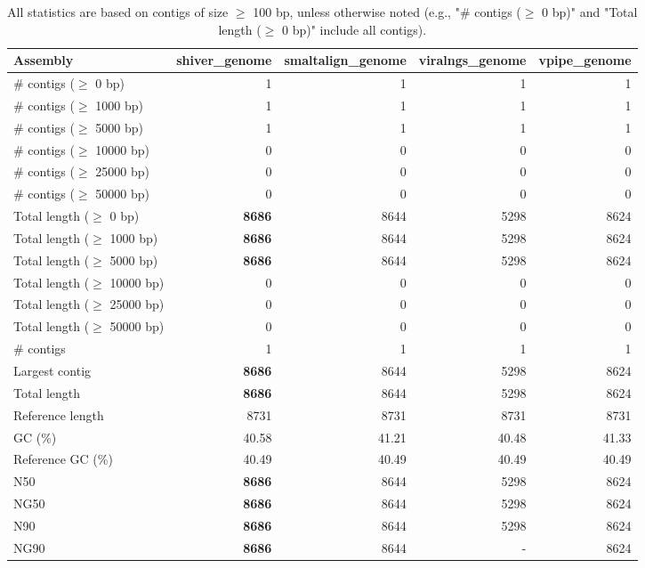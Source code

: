 \documentclass[12pt,a4paper]{article}
\begin{document}
\begin{table}[ht]
\begin{center}
\caption{All statistics are based on contigs of size $\geq$ 100 bp, unless otherwise noted (e.g., "\# contigs ($\geq$ 0 bp)" and "Total length ($\geq$ 0 bp)" include all contigs).}
\begin{tabular}{|l*{4}{|r}|}
\hline
Assembly & shiver\_genome & smaltalign\_genome & viralngs\_genome & vpipe\_genome \\ \hline
\# contigs ($\geq$ 0 bp) & 1 & 1 & 1 & 1 \\ \hline
\# contigs ($\geq$ 1000 bp) & 1 & 1 & 1 & 1 \\ \hline
\# contigs ($\geq$ 5000 bp) & 1 & 1 & 1 & 1 \\ \hline
\# contigs ($\geq$ 10000 bp) & 0 & 0 & 0 & 0 \\ \hline
\# contigs ($\geq$ 25000 bp) & 0 & 0 & 0 & 0 \\ \hline
\# contigs ($\geq$ 50000 bp) & 0 & 0 & 0 & 0 \\ \hline
Total length ($\geq$ 0 bp) & {\bf 8686} & 8644 & 5298 & 8624 \\ \hline
Total length ($\geq$ 1000 bp) & {\bf 8686} & 8644 & 5298 & 8624 \\ \hline
Total length ($\geq$ 5000 bp) & {\bf 8686} & 8644 & 5298 & 8624 \\ \hline
Total length ($\geq$ 10000 bp) & 0 & 0 & 0 & 0 \\ \hline
Total length ($\geq$ 25000 bp) & 0 & 0 & 0 & 0 \\ \hline
Total length ($\geq$ 50000 bp) & 0 & 0 & 0 & 0 \\ \hline
\# contigs & 1 & 1 & 1 & 1 \\ \hline
Largest contig & {\bf 8686} & 8644 & 5298 & 8624 \\ \hline
Total length & {\bf 8686} & 8644 & 5298 & 8624 \\ \hline
Reference length & 8731 & 8731 & 8731 & 8731 \\ \hline
GC (\%) & 40.58 & 41.21 & 40.48 & 41.33 \\ \hline
Reference GC (\%) & 40.49 & 40.49 & 40.49 & 40.49 \\ \hline
N50 & {\bf 8686} & 8644 & 5298 & 8624 \\ \hline
NG50 & {\bf 8686} & 8644 & 5298 & 8624 \\ \hline
N90 & {\bf 8686} & 8644 & 5298 & 8624 \\ \hline
NG90 & {\bf 8686} & 8644 & - & 8624 \\ \hline

\end{tabular}
\end{center}
\end{table}
\end{document}
